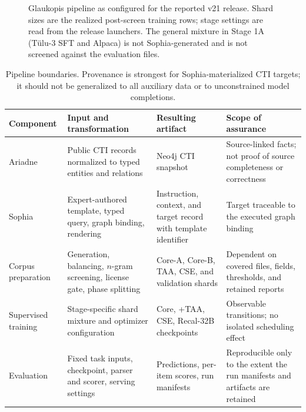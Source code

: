 \documentclass[twocolumn]{svjour3}
\begin{document}
\begin{figure}
{}
\caption{Glaukopis pipeline as configured for the reported v21 release. Shard sizes are the realized post-screen training rows; stage settings are read from the release launchers. The general mixture in Stage 1A (T\"ulu-3 SFT and Alpaca) is not Sophia-generated and is not screened against the evaluation files.}\label{fig:pipeline}
\end{figure}

\begin{table}
\centering\footnotesize
\caption{Pipeline boundaries. Provenance is strongest for Sophia-materialized CTI targets; it should not be generalized to all auxiliary data or to unconstrained model completions.}\label{tab:boundaries}
\begin{tabularx}{\textwidth}{@{}p{2.4cm}XXX@{}}
\toprule Component & Input and transformation & Resulting artifact & Scope of assurance \\\midrule
Ariadne & Public CTI records normalized to typed entities and relations & Neo4j CTI snapshot & Source-linked facts; not proof of source completeness or correctness \\
Sophia & Expert-authored template, typed query, graph binding, rendering & Instruction, context, and target record with template identifier & Target traceable to the executed graph binding \\
Corpus preparation & Generation, balancing, $n$-gram screening, license gate, phase splitting & Core-A, Core-B, TAA, CSE, and validation shards & Dependent on covered files, fields, thresholds, and retained reports \\
Supervised training & Stage-specific shard mixture and optimizer configuration & Core, +TAA, CSE, Recal-32B checkpoints & Observable transitions; no isolated scheduling effect \\
Evaluation & Fixed task inputs, checkpoint, parser and scorer, serving settings & Predictions, per-item scores, run manifests & Reproducible only to the extent the run manifests and artifacts are retained \\\bottomrule
\end{tabularx}
\end{table}
\end{document}
